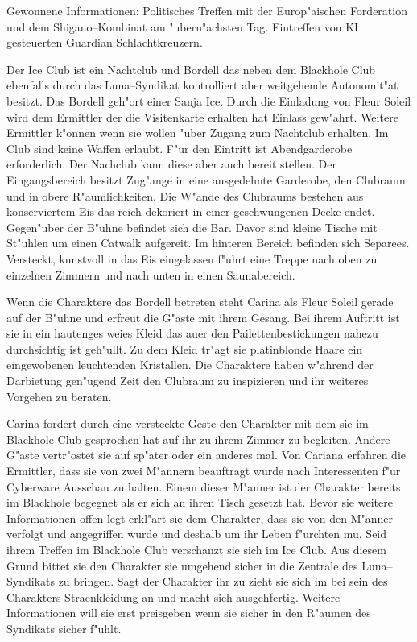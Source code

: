 \begin{remarks}
	Gewonnene Informationen: Politisches Treffen mit der Europ"aischen Forderation und dem Shigano--Kombinat am "ubern"achsten Tag. Eintreffen von KI gesteuerten Guardian Schlachtkreuzern.
\end{remarks}


Der Ice Club ist ein Nachtclub und Bordell das neben dem Blackhole Club ebenfalls durch das Luna--Syndikat kontrolliert aber weitgehende Autonomit"at besitzt. Das Bordell geh"ort einer Sanja Ice. Durch die Einladung von Fleur Soleil wird dem Ermittler der die Visitenkarte erhalten hat Einlass gew"ahrt. Weitere Ermittler k"onnen wenn sie wollen "uber \xl{} Zugang zum Nachtclub erhalten. Im Club sind keine Waffen erlaubt. F"ur den Eintritt ist Abendgarderobe erforderlich. Der Nachclub kann diese aber auch bereit stellen. Der Eingangsbereich besitzt Zug"ange in eine ausgedehnte Garderobe, den Clubraum und in obere R"aumlichkeiten. Die W"ande des Clubraums bestehen aus konserviertem Eis das reich dekoriert in einer geschwungenen Decke endet. Gegen"uber der B"uhne befindet sich die Bar. Davor sind kleine Tische mit St"uhlen um einen Catwalk aufgereit. Im hinteren Bereich befinden sich Separees. Versteckt, kunstvoll in das Eis eingelassen f"uhrt eine Treppe nach oben zu einzelnen Zimmern und nach unten in einen Saunabereich.

Wenn die Charaktere das Bordell betreten steht Carina als Fleur Soleil gerade auf der B"uhne und erfreut die G"aste mit ihrem Gesang. Bei ihrem Auftritt ist sie in ein hautenges wei\3es Kleid das au\3er den Pailettenbestickungen nahezu durchsichtig ist geh"ullt. Zu dem Kleid tr"agt sie platinblonde Haare ein eingewobenen leuchtenden Kristallen. Die Charaktere haben w"ahrend der Darbietung gen"ugend Zeit den Clubraum zu inspizieren und ihr weiteres Vorgehen zu beraten.

Carina fordert durch eine versteckte Geste den Charakter mit dem sie im Blackhole Club gesprochen hat auf ihr zu ihrem Zimmer zu begleiten. Andere G"aste vertr"ostet sie auf sp"ater oder ein anderes mal. Von Cariana erfahren die Ermittler, dass sie von zwei M"annern beauftragt wurde nach Interessenten f"ur Cyberware Ausschau zu halten. Einem dieser M"anner ist der Charakter bereits im Blackhole begegnet als er sich an ihren Tisch gesetzt hat. Bevor sie weitere Informationen offen legt erkl"art sie dem Charakter, dass sie von den M"anner verfolgt und angegriffen wurde und deshalb um ihr Leben f"urchten mu\3. Seid ihrem Treffen im Blackhole Club verschanzt sie sich im Ice Club. Aus diesem Grund bittet sie den Charakter sie umgehend sicher in die Zentrale des Luna--Syndikats zu bringen. Sagt der Charakter ihr zu zieht sie sich im bei sein des Charakters Stra\3enkleidung an und macht sich ausgehfertig. Weitere Informationen will sie erst preisgeben wenn sie sicher in den R"aumen des Syndikats sicher f"uhlt.

